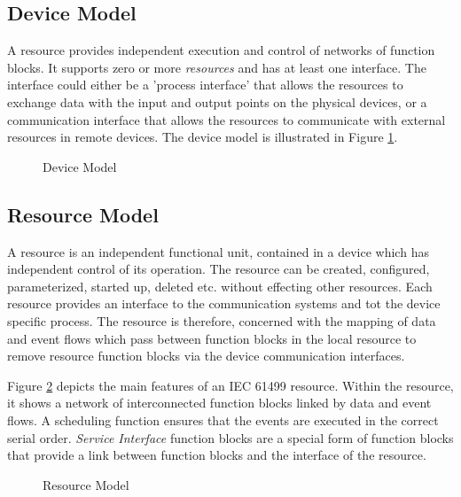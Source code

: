 \subsection*{Device Model} 
A resource provides independent execution and control of
networks of function blocks. It supports zero or more {\it
  resources} and has at least one interface. The interface
could either be a 'process interface' that allows the
resources to exchange data with the input and output points
on the physical devices, or a communication interface that
allows the resources to communicate with external resources
in remote devices. The device model is illustrated in Figure
\ref{f:Device_Model}.

\begin{figure}
  \begin{center}
    \caption[Device Model]
            {Device Model{\protect ~\cite{iec:614991:2000}}}
    \label{f:Device_Model}
  \end{center}
\end{figure}

\subsection*{Resource Model} 
A resource is an independent functional unit, contained in a
device which has independent control of its operation. The
resource can be created, configured, parameterized, started
up, deleted etc. without effecting other resources. Each
resource provides an interface to the communication systems
and tot the device specific process. The resource is
therefore, concerned with the mapping of data and event
flows which pass between function blocks in the local
resource to remove resource function blocks via the device
communication interfaces.
  
Figure \ref{f:Resource_Model} depicts the main features of
an IEC 61499 resource. Within the resource, it shows a
network of interconnected function blocks linked by data and
event flows. A scheduling function ensures that the events
are executed in the correct serial order. {\it Service
  Interface} function blocks are a special form of function
blocks that provide a link between function blocks and the
interface of the resource.

\begin{figure}
  \begin{center}
    \caption[Resource Model]
            {Resource Model{\protect ~\cite{iec:614991:2000}}}
    \label{f:Resource_Model}
  \end{center}
\end{figure}
  
